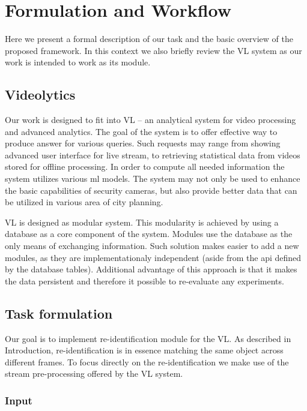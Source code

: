 \chapter{Formulation and Workflow}

Here we present a formal description of our task and the basic overview of
the proposed framework. In this context we also briefly review the \gls{VL}
system as our work is intended to work as its module.

\section{Videolytics}

Our work is designed to fit into \gls{VL}  -- an analytical system
for video processing and advanced analytics. The goal of the system is to offer
effective way to produce answer for various queries. Such requests may range
from showing advanced user interface for live stream, to retrieving statistical
data from videos stored for offline processing. In order to compute all needed
information the system utilizes various \gls{ml} models. The
system may not only be used to enhance the basic capabilities of security
cameras, but also provide better data that can be utilized in various area of
city planning.

\Gls{VL} is designed as modular system. This modularity is achieved by using
a database as a core component of the system. Modules use the database as the
only means of exchanging information. Such solution makes easier to add a new
modules, as they are implementationaly independent (aside from the
\gls{api} defined by the database tables). Additional advantage of this
approach is that it makes the data persistent and therefore it possible to
re-evaluate any experiments.

\section{Task formulation}

Our goal is to implement re-identification module for the \gls{VL}. As
described in Introduction, re-identification is in essence matching the
same object across different frames. To focus directly on the re-identification
we make use of the stream pre-processing offered by the \gls{VL} system.

\subsection{Input}


